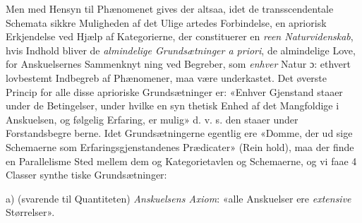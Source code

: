 \documentclass[12pt,a4paper]{book}
\begin{document}
Men med Hensyn til Phænomenet gives der altsaa, idet
de transscendentale Schemata sikkre Muligheden af det Ulige\-%
artedes Forbindelse, en apriorisk Erkjendelse ved Hjælp af
Kategorierne, der constituerer en \emph{reen Naturvidenskab},
hvis Indhold bliver de \emph{almindelige Grundsætninger
a priori}, de almindelige Love, for Anskuelsernes Sammenknyt\-%
ning ved Begreber, som \emph{enhver} Natur ɔ: ethvert lovbestemt
Indbegreb af Phænomener, maa være underkastet. Det øverste
Princip for alle disse aprioriske Grundsætninger er: «Enhver
Gjenstand staaer under de Betingelser, under hvilke en syn\-%
thetisk Enhed af det Mangfoldige i Anskuelsen, og følgelig
Erfaring, er mulig» d. v. s. den staaer under Forstandsbegre\-%
berne. Idet Grundsætningerne egentlig ere «Domme, der ud\-%
sige Schemaerne som Erfaringsgjenstandenes Prædicater» (Rein\-%
hold), maa der finde en Parallelisme Sted mellem dem og
Kategorietavlen og Schemaerne, og vi faae 4 Classer synthe\-%
tiske Grundsætninger:

a) (svarende til Quantiteten) \emph{Anskuelsens Axiom}:
«alle Anskuelser ere \emph{extensive} Størrelser».
\end{document}
